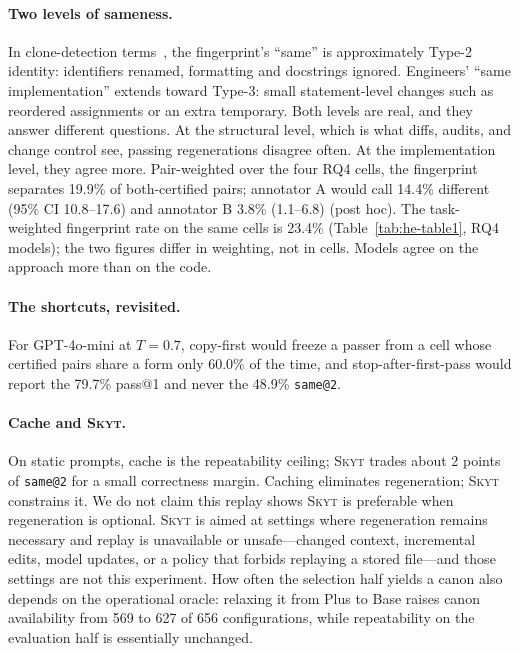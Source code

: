 \documentclass[acmsmall,screen,review,anonymous]{acmart}
\makeatletter
\newcommand{\skyt}{\textsc{Skyt}}
\newcommand{\sameat}{\mbox{\texttt{same@2}}}
\makeatother
\begin{document}
\paragraph{Two levels of sameness.}
In clone-detection terms~\cite{roy2009clone}, the fingerprint's ``same'' is
approximately Type-2 identity: identifiers renamed, formatting and docstrings
ignored.
Engineers' ``same implementation'' extends toward Type-3: small statement-level
changes such as reordered assignments or an extra temporary.
Both levels are real, and they answer different questions.
At the structural level, which is what diffs, audits, and change control see,
passing regenerations disagree often.
At the implementation level, they agree more.
Pair-weighted over the four RQ4 cells, the fingerprint separates 19.9\% of both-certified pairs; annotator A would call 14.4\% different (95\% CI 10.8--17.6) and annotator B 3.8\% (1.1--6.8) (post hoc). The task-weighted fingerprint rate on the same cells is 23.4\% (Table~\ref{tab:he-table1}, RQ4 models); the two figures differ in weighting, not in cells.
Models agree on the approach more than on the code.

\paragraph{The shortcuts, revisited.}
For GPT-4o-mini at $T{=}0.7$, copy-first would freeze a passer from a cell whose
certified pairs share a form only 60.0\% of the time, and stop-after-first-pass
would report the 79.7\% pass@1 and never the 48.9\% \sameat{}.

\paragraph{Cache and \skyt{}.}
On static prompts, cache is the repeatability ceiling; \skyt{} trades about 2
points of \sameat{} for a small correctness margin.
Caching eliminates regeneration; \skyt{} constrains it.
We do not claim this replay shows \skyt{} is preferable when regeneration is
optional.
\skyt{} is aimed at settings where regeneration remains necessary and replay
is unavailable or unsafe---changed context, incremental edits, model updates,
or a policy that forbids replaying a stored file---and those settings are not
this experiment.
How often the selection half yields a canon also depends on the operational oracle:
relaxing it from Plus to Base raises canon availability from 569 to 627 of 656
configurations, while repeatability on the evaluation half is essentially unchanged.
\end{document}
